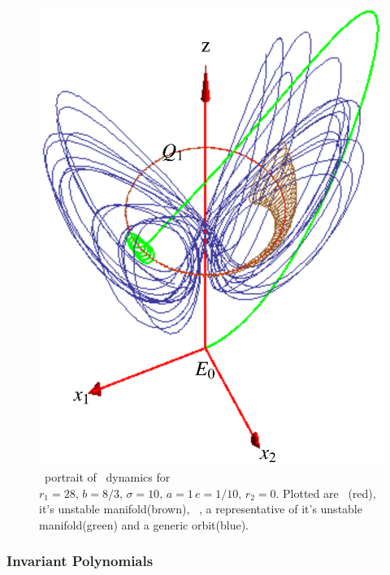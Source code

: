 \begin{figure}[t]
\begin{center}
  \includegraphics[height=0.25\textheight]{../figs/CLE.eps}
\end{center}
\caption[Complex Lorenz system phase space]{ \Statesp\
portrait of \CLe\ dynamics for $r_1=28,\, b=8/3,\, \sigma=10,\, a=1\, e=1/10,\, r_2=0$.
Plotted are \reqv\ \REQB{1}(red), it's unstable manifold(brown),
\eqv\ \EQB{0}, a representative of it's unstable manifold(green) and a generic orbit(blue).}
\label{fig:CLE}
\end{figure}

\subsubsection{Invariant Polynomials}


